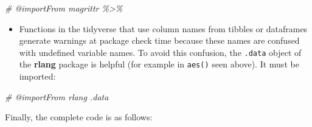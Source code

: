 \documentclass[
  12pt,
  american,
  a4paper,
  extrafontsizes,onecolumn,openright
  ]{memoir}
\newenvironment{Shaded}{\begin{snugshade}}{\end{snugshade}}
\newcommand{\CommentTok}[1]{\textcolor[rgb]{0.56,0.35,0.01}{\textit{#1}}}
\providecommand{\tightlist}{%
  \setlength{\itemsep}{0pt}\setlength{\parskip}{0pt}}
\begin{document}
\scriptsize

\begin{Shaded}
\begin{Highlighting}[]
\CommentTok{\#\textquotesingle{} @importFrom magrittr \textasciigrave{}\%\textgreater{}\%\textasciigrave{}}
\end{Highlighting}
\end{Shaded}

\normalsize

\begin{itemize}
\tightlist
\item
  Functions in the tidyverse that use column names from tibbles or dataframes generate warnings at package check time because these names are confused with undefined variable names.
  To avoid this confusion, the \texttt{.data} object of the \textbf{rlang} package is helpful (for example in \texttt{aes()} seen above).
  It must be imported:
\end{itemize}

\scriptsize

\begin{Shaded}
\begin{Highlighting}[]
\CommentTok{\#\textquotesingle{} @importFrom rlang .data}
\end{Highlighting}
\end{Shaded}

\normalsize

Finally, the complete code is as follows:

\scriptsize
\end{document}
